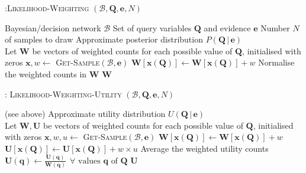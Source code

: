 \begin{algorithm}[ht]
\caption{:\textsc{Likelihood-Weighting} $(\mathcal{B},\mathbf{Q}, \mathbf{e}, N)$}
\begin{algorithmic} \vspace{2mm} 
\REQUIRE Bayesian/decision network $\mathcal{B}$
\REQUIRE Set of query variables $\mathbf{Q}$ and evidence $\mathbf{e}$
\REQUIRE Number $N$ of samples to draw
\ENSURE Approximate posterior distribution $P(\mathbf{Q} \, | \, \mathbf{e})$ \\[2mm]
\STATE Let $\mathbf{W}$ be vectors of weighted counts for each possible value of $\mathbf{Q}$, initialised with zeros
\STATE $\mathbf{x}, w \leftarrow $ \textsc{Get-Sample}$(\mathcal{B}, \mathbf{e})$ 
\STATE $\mathbf{W}[\mathbf{x}(\mathbf{Q})] \leftarrow \mathbf{W}[\mathbf{x}(\mathbf{Q})] + w$
\ENDFOR
\STATE Normalise the weighted counts in $\mathbf{W}$
\RETURN $\mathbf{W}$  \vspace{1mm} 
\end{algorithmic}
\label{algo:lw}
\end{algorithm}

\begin{algorithm}[ht]
\caption{: \textsc{Likelihood-Weighting-Utility} $(\mathcal{B},\mathbf{Q}, \mathbf{e}, N)$}
\begin{algorithmic} \vspace{2mm} 
\REQUIRE (see above)
\ENSURE Approximate utility distribution $U(\mathbf{Q} \, | \, \mathbf{e})$ \\[2mm]
\STATE Let $\mathbf{W}, \mathbf{U}$ be vectors of weighted counts for each possible value of $\mathbf{Q}$, initialised with zeros
\STATE $\mathbf{x}, w, u \leftarrow $ \textsc{Get-Sample}$(\mathcal{B}, \mathbf{e})$ 
\STATE $\mathbf{W}[\mathbf{x}(\mathbf{Q})] \leftarrow \mathbf{W}[\mathbf{x}(\mathbf{Q})] + w$
\STATE $\mathbf{U}[\mathbf{x}(\mathbf{Q})] \leftarrow \mathbf{U}[\mathbf{x}(\mathbf{Q})] + w \times u$
\ENDFOR
\STATE Average the weighted utility counts $\mathbf{U}(\mathbf{q}) \leftarrow \frac{\mathbf{U}(\mathbf{q})}{\mathbf{W}(\mathbf{q})} \ \ \forall \text{ values } \mathbf{q} \text{ of } \mathbf{Q}$ 
\RETURN $\mathbf{U}$  \vspace{1mm} 
\end{algorithmic}
\label{algo:lwu}
\end{algorithm}


